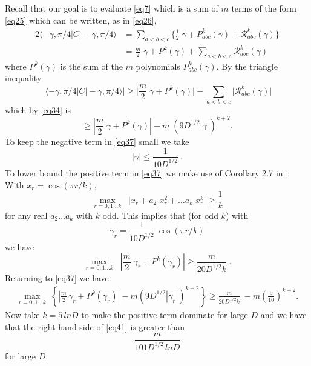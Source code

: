 \documentclass[t11pt,preprint,preprintnumbers]{revtex4}
\begin{document}
Recall that our goal is to evaluate \eqref{eq7} which is a sum of $m$ terms of the form \eqref{eq25} which can be written, as in \eqref{eq26},
\begin{alignat}{2}\label{eq35}
\langle -\gamma, \pi/4| C | -\gamma,  \pi/4\rangle
&= \sum\limits_{a < b < c} \{\tfrac{1}{2} \;  \gamma + P^k_{abc} (\gamma) + \mathcal{R}^k_{abc} (\gamma)\}\\[.5ex]
& = \frac{m}{2} \; \gamma + P^k (\gamma) + \sum\limits_{a< b < c} \mathcal{R}^k_{abc} (\gamma)\nonumber
\end{alignat}
where $P^k (\gamma)$ is the sum of the $m$ polynomials $P^k_{abc} (\gamma)$. By the triangle inequality 
\begin{equation}\label{eq36}
\bigg|\langle -\gamma, \pi/4| C | - \gamma,  \pi/4\rangle \bigg| \geqslant  \bigg| \frac{m}{2} \; \gamma + P^k (\gamma) \bigg| - \sum\limits_{a < b < c} \bigg| \mathcal{R}^k_{abc} (\gamma) \bigg|
\end{equation}
which by \eqref{eq34} is
\begin{equation}\label{eq37}
\geqslant  \left| \frac{m}{2} \; \gamma + P^k (\gamma) \right| - m\; (9 D^{1/2} |\gamma|)^{k + 2} .
\end{equation}
To keep the negative term in \eqref{eq37} small we take
\begin{equation}\label{eq38}
| \gamma | \leqslant  \frac{1}{10 D^{1/2}} \ .
\end{equation}
To lower bound the positive term in \eqref{eq37} we make use of Corollary 2.7 in \cite{Dinur-2007}:\\
With $x_r = \cos (\pi r/k)$,
\begin{equation}\label{eq39}
\max\limits_{r = 0,1\ldots k} \; \;   \Big| x_r + a_2\;  x^2_r + \ldots a_k\;  x^k_r  \Big| \geqslant \frac{1}{k}%
\end{equation}
for any real $a_2 \ldots a_k$ with $k$ odd. This implies that (for odd $k$) with
\begin{equation}\label{eq40-TEMP}%
\gamma_r = \frac{1}{10 D^{1/2}}\ \cos (\pi r/k)
\end{equation}
we have
\begin{equation}\label{eq40}
\max\limits_{r = 0,1\ldots k}  \; \; \left| \frac{m}{2}\; \gamma_r + P^k (\gamma_r) \right| \geqslant \frac{m}{20 D^{1/2} k}\ .
\end{equation}
Returning to \eqref{eq37} we have
\begin{eqnarray}\label{eq41}
\max\limits_{r = 0,1\ldots k} \; \left\{ \left| \frac{m}{2}\,  \gamma_r + P^k (\gamma_r) \right| - m (9 D^{1/2} |\gamma_r |)^{k+2} \right\} \geqslant \frac{m}{20 D^{1/2} k} \; - m \left(\frac{9}{10}\right)^{k+2} .
\end{eqnarray}
Now take  $k = 5\, l n D$ to make the positive term dominate for large $D$ and we have that the right hand side of \eqref{eq41} is greater than
\begin{equation}\label{eq42}
\frac{m}{101 D^{1/2}\, l n D}
\end{equation}
for large $D$.
\end{document}
